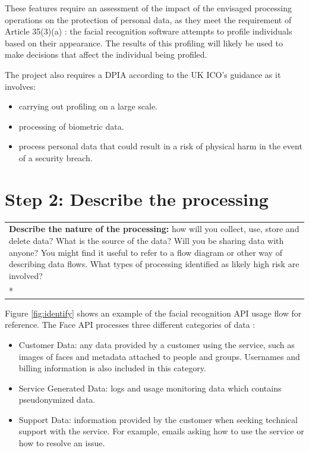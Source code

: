\documentclass[12pt]{extarticle}
\begin{document}
These features require an assessment of the impact of the envisaged processing operations on the protection of personal data, as they meet the requirement of Article 35(3)(a) \cite{EUdataregulations2018}: the facial recognition software attempts to profile individuals based on their appearance. The results of this profiling will likely be used to make decisions that affect the individual being profiled.

The project also requires a DPIA according to the UK ICO's guidance as it involves:
\begin{itemize}
    \itemsep0em 
    \item carrying out profiling on a large scale.
    \item processing of biometric data.
    \item process personal data that could result in a risk of physical harm in the event of a security breach.
\end{itemize}

\pagebreak

\section*{Step 2: Describe the processing} 

\begin{longtable}{p{\linewidth}} 
\hline %
\multicolumn{1}{|p{\linewidth}|}{
\textbf{Describe the nature of the processing: }how will you collect, use, store and delete data? What is the source of the data? Will you be sharing data with anyone? You might find it useful to refer to a flow diagram or other way of describing data flows. What types of processing identified as likely high risk are involved?} \\*
\hhline{-} %
\end{longtable} 

Figure \ref{fig:identify} shows an example of the facial recognition API usage flow for reference. The Face API processes three different categories of data \cite{robmazz}: 
\begin{itemize}
    \item Customer Data: any data provided by a customer using the service, such as images of faces and metadata attached to people and groups. 
          Usernames and billing information is also included in this category.
    \item Service Generated Data: logs and usage monitoring data which contains pseudonymized data. 
    \item Support Data: information provided by the customer when seeking technical support with the service. For example, emails asking how to use the service or how to resolve an issue.
\end{itemize}
\end{document}
